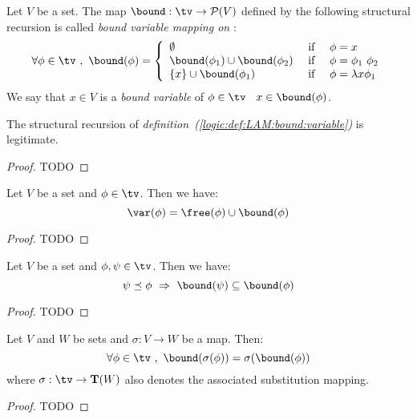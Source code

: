 \begin{defin}\label{logic:def:LAM:bound:variable}
    Let $V$ be a set. The map $\bound:\tv\to {\cal P}(V)$ defined by the
    following structural recursion is called {\em bound variable mapping on \tv}:
    \begin{equation}\label{logic:eqn:LAM:bound:var:recursion}
        \forall\phi\in\tv\ ,\ \bound(\phi)=
            \left\{\begin{array}{lcl}
                \emptyset&\mbox{\ if\ }&\phi=x
                \\
                \bound(\phi_{1})\cup\bound(\phi_{2}) 
                    &\mbox{\ if\ }&
                \phi=\phi_{1}\ \phi_{2}
                \\
                \{x\}\cup\bound(\phi_{1})&\mbox{\ if\ }&\phi=\lambda x\phi_{1}
            \end{array}\right.
    \end{equation}
    We say that $x\in V$ is a {\em bound variable} of $\phi\in\tv$ \ifand\ 
    $x\in\bound(\phi)$.
\end{defin}

\begin{prop}\label{logic:prop:LAM:bound:variable}
    The structural recursion of {\em 
    definition~(\ref{logic:def:LAM:bound:variable})} is legitimate.
\end{prop}
\begin{proof}
TODO
\end{proof}

\begin{prop}\label{logic:prop:LAM:boundvar:free}
    Let $V$ be a set and $\phi\in\tv$. Then we have:
    \begin{equation}\label{logic:eqn:LAM:boundvar:free:1}
        \var(\phi)=\free(\phi)\cup\bound(\phi)
    \end{equation}
\end{prop}
\begin{proof}
TODO
\end{proof}

\begin{prop}\label{logic:prop:LAM:boundvar:subformula}
    Let $V$ be a set and $\phi,\psi\in\tv$. Then we have:
    \[
        \psi\preceq\phi\ \Rightarrow\ \bound(\psi)\subseteq\bound(\phi)
    \]
\end{prop}
\begin{proof}
TODO
\end{proof}

\begin{prop}\label{logic:prop:LAM:boundvar:of:substitution}
    Let $V$ and $W$ be sets and $\sigma:V\to W$ be a map. Then:
    \[
        \forall\phi\in\tv\ ,\ \bound(\sigma(\phi))=\sigma(\bound(\phi))
    \]
    where $\sigma:\tv\to{\bf T}(W)$ also denotes the associated substitution 
    mapping.
\end{prop}
\begin{proof}
TODO
\end{proof}


